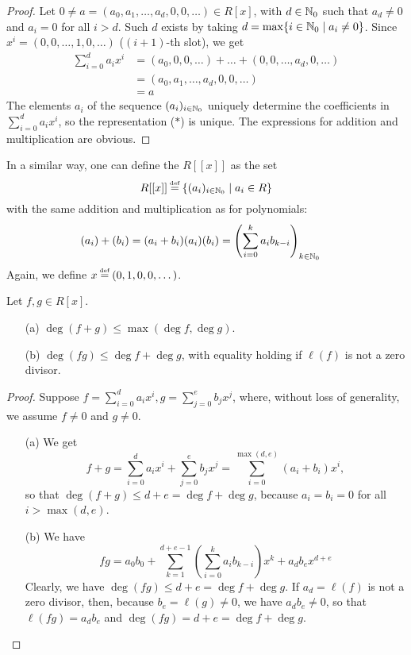 \documentclass[11pt]{book}
\theoremstyle{definition}   \newtheorem{defn}[counter]{Definition} %
\newcommand\myeq{\mathrel{\overset{\makebox[0pt]{\mbox{\normalfont\tiny\sffamily \textrm{def}}}}{=}}}
\newcommand{\vs}{\vspace{8pt}}
\numberwithin{counter}{chapter}
\begin{document}
\begin{proof}
Let $ 0 \ne a = (a_0,a_1,\dots,a_d,0,0,\dots) \in R[x]$, with $d \in \operatorname{\mathbb{N}}_0$ such that $a_d \ne 0$ and $a_i = 0$ for all $i > d$. Such $d$ exists by taking $d = \max \{i\in \operatorname{\mathbb{N}}_0 \mid a_i \ne 0\}$. Since $x^i = (0,0,\dots,1,0,\dots)$ ($(i+1)$-th slot), we get
\begin{align*}
\sum_{i=0}^d a_i x^i &= (a_0,0,0,\dots) + \dots + (0,0,\dots,a_d,0,\dots) \\
&= (a_0,a_1,\dots,a_d,0,0,\dots) \\
&= a
\end{align*}
The elements $a_i$ of the sequence $(a_i)_{i \in \operatorname{\mathbb{N}}_0}$ uniquely determine the coefficients in $\sum_{i=0}^d a_i x^i$, so the representation ($\ast$) is unique. The expressions for addition and multiplication are obvious.
\end{proof}

\vs

\begin{remark}
In a similar way, one can define the  $R[[x]]$ as the set
	\[R[[x]] \myeq \{(a_i)_{i \in \N_0} \mid a_i \in R \} \]
with the same addition and multiplication as for polynomials:
\begin{align*}
(a_i) + (b_i) = (a_i + b_i) (a_i)(b_i) &= \left(\sum_{i=0}^k a_i b_{k-i} \right)_{k \in \operatorname{\mathbb{N}}_0}
\end{align*}
Again, we define $x \myeq (0,1,0,0,\dots)$.
\end{remark}

\vs

\begin{lemma}
Let $f,g \in R[x]$.
\begin{enumerate}
\item[(a)] $\deg (f+g) \leq \max(\deg f, \deg g)$.
\item[(b)] $\deg(fg) \leq \deg f + \deg g$, with equality holding if $\ell(f)$ is not a zero divisor.
\end{enumerate}

\begin{proof}
Suppose $f = \sum_{i=0}^d a_i x^i, g = \sum_{j=0}^e b_j x^j$, where, without loss of generality, we assume $f \ne 0$ and $g \ne 0$.
\begin{enumerate}
\item[(a)] We get
	\[f + g = \sum_{i=0}^d a_i x^i + \sum_{j=0}^e b_j x^j = \sum_{i=0}^{\max(d,e)} (a_i + b_i)x^i, \]
so that $\deg(f+g) \leq d+e = \deg f + \deg g$, because $a_i = b_i = 0$ for all $i > \max(d,e)$.

\item[(b)] We have
\[fg = a_0 b_0 + \sum_{k=1}^{d+e-1} \left(\sum_{i=0}^k a_i b_{k-i}\right)x^k + a_d b_ex^{d+e} \]
Clearly, we have $\deg (fg) \leq d+e = \deg f + \deg g$. If $a_d = \ell(f)$ is not a zero divisor, then, because $b_e = \ell(g) \ne 0$, we have $a_db_e \ne 0$, so that $\ell(fg) = a_d b_e$ and $\deg(fg) = d+e = \deg f + \deg g$.
\end{enumerate}
\end{proof}
\end{lemma}
\end{document}

